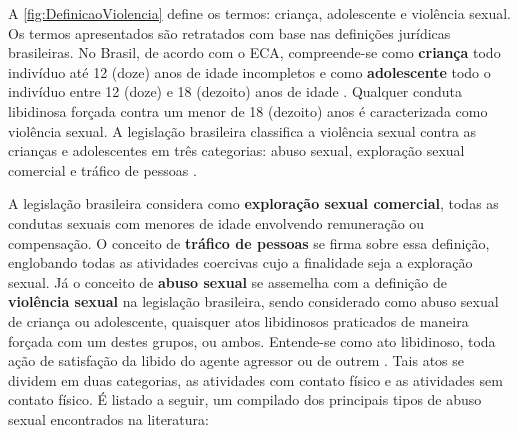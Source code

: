 A \autoref{fig:DefinicaoViolencia} define os termos: criança, adolescente e violência sexual. Os termos apresentados são retratados com base nas definições jurídicas brasileiras. No Brasil, de acordo com o \ac{ECA}, compreende-se como \textbf{criança} todo indivíduo até 12 (doze) anos de idade incompletos e como \textbf{adolescente} todo o indivíduo entre 12 (doze) e 18 (dezoito) anos de idade \cite{Lei:8069:1990}. Qualquer conduta libidinosa forçada contra um menor de 18 (dezoito) anos é caracterizada como violência sexual. A legislação brasileira classifica a violência sexual contra as crianças e adolescentes em três categorias: abuso sexual, exploração sexual comercial e tráfico de pessoas \cite{Lei:13431:2017}.

A legislação brasileira considera como \textbf{exploração sexual comercial}, todas as condutas sexuais com menores de idade envolvendo remuneração ou compensação. O conceito de \textbf{tráfico de pessoas} se firma sobre essa definição, englobando todas as atividades coercivas cujo a finalidade seja a exploração sexual. Já o conceito de \textbf{abuso sexual} se assemelha com a definição de \textbf{violência sexual} na legislação brasileira, sendo considerado como abuso sexual de criança ou adolescente, quaisquer atos libidinosos praticados de maneira forçada com um destes grupos, ou ambos. Entende-se como ato libidinoso, toda ação de satisfação da libido do agente agressor ou de outrem \cite{Lei:13431:2017}. Tais atos se dividem em duas categorias, as atividades com contato físico e as atividades sem contato físico. É listado a seguir, um compilado dos principais tipos de abuso sexual encontrados na literatura: 

